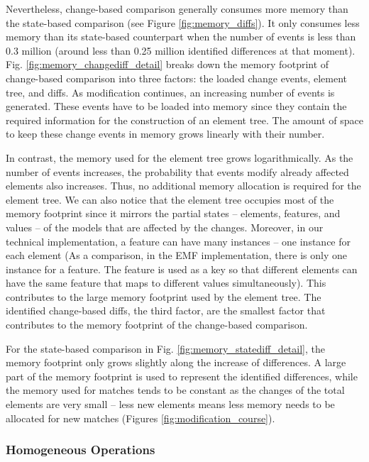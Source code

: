 \documentclass{jot}
\begin{document}
    Nevertheless, change-based comparison generally consumes more memory than the state-based comparison (see Figure \ref{fig:memory_diffs}). It only consumes less memory than its state-based counterpart when the number of events is less than 0.3 million (around less than 0.25 million identified differences at that moment). Fig. \ref{fig:memory_changediff_detail} breaks down the memory footprint of change-based comparison into three factors: the loaded change events, element tree, and diffs. As modification continues, an increasing number of events is generated. These events have to be loaded into memory since they contain the required information for the construction of an element tree. The amount of space to keep these change events in memory grows linearly with their number. 
    
    In contrast, the memory used for the element tree grows logarithmically. As the number of events increases, the probability that events modify already affected elements also increases. Thus, no additional memory allocation is required for the element tree. We can also notice that the element tree occupies most of the memory footprint since it mirrors the partial states -- elements, features, and values -- of the models that are affected by the changes. Moreover, in our technical implementation, a feature can have many instances -- one instance for each element (As a comparison, in the EMF implementation, there is only one instance for a feature. The feature is used as a key so that different elements can have the same feature that maps to different values simultaneously). This contributes to the large memory footprint used by the element tree. The identified change-based diffs, the third factor, are the smallest factor that contributes to the memory footprint of the change-based comparison. 
    
    For the state-based comparison in Fig. \ref{fig:memory_statediff_detail}, the memory footprint only grows slightly along the increase of differences. A large part of the memory footprint is used to represent the identified differences, while the memory used for matches tends to be constant as the changes of the total elements are very small -- less new elements means less memory needs to be allocated for new matches (Figures \ref{fig:modification_course}). 
    
    \subsubsection{Homogeneous Operations}
    \label{sec:homogeneous-operation}
    
\end{document}
